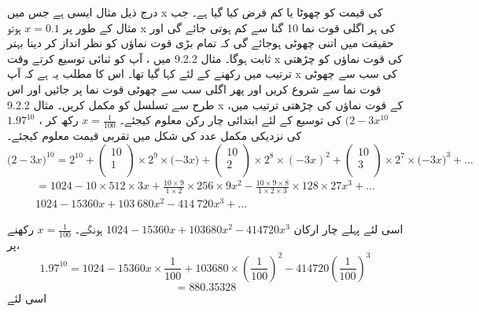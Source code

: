 درج ذیل مثال ایسی ہے جس میں  
x
کی قیمت کو چھوٹا یا کم فرض کیا گیا ہے۔   جب مثال کے طور پر  
\(x=0.1\)
ہوتو   
x
کی ہر اگلی قوت نما  
10
  گنا سے کم ہوتی جائے گی اور حقیقت میں اتنی چھوٹی ہوجائے گی کہ تمام بڑی قوت نماؤں کو نظر  انداز  کر دینا  بہتر  ثابت  ہوگا۔  
مثال 
9.2.2
  میں ،   آپ کو  ثنائی  توسیع  کرتے وقت  
x
کی قوت نماؤں کو  چڑھتی ترتیب میں رکھنے کے لئے کہا گیا تھا۔  اس کا مطلب یہ ہے کہ آپ
x
   کی سب سے چھوٹی قوت نما سے شروع کریں اور پھر اگلی سب سے چھوٹی قوت نما پر جائیں اور اس طرح سے تسلسل کو مکمل کریں۔ 
مثال  
9.2.2
x
کے قوت نماؤں کی چڑھتی ترتیب میں،  
\((2-3{x}^{10}\)
کی توسیع کے لئے ابتدائی چار رکن معلوم کیجئے۔  
 \(x=\frac{1}{100}\)
  رکھ کر  ،  
\(1.97^{10}\)
 کی نزدیکی مکمل عدد کی شکل میں تقربی قیمت  معلوم کیجئے۔ 
 \[(2-3{x)}^{10}= {2}^{10}+
\begin{pmatrix}
10\\
1\\
\end{pmatrix}
\times{2}^{9}\times{(-3{x)}}+
\begin{pmatrix}
10\\
2\\
\end{pmatrix}
\times{2}^{8}\times{(-3{x})^{2}}+ \begin{pmatrix}
10\\
3\\
\end{pmatrix}\times{2}^{7}\times{(-3{x)}}^{3}+... \]
\begin{align*}
=1024-10\times512\times3{x}+{\frac{10\times9}{1\times2}}\times256\times9{x}^{2}-{\frac{10\times9\times8}{1\times2\times3}}\times128\times27{x}^{3}+...\\
 1024-15360x+103\ 680{x}^{2}-414\ 720{x}^{3}+...
 \end{align*}


اسی لئے پہلے چار ارکان
\(1024-15 360{x}+103 680{x}^{2}-414720{x}^{3}\)
ہونگے۔
\(x=\frac{1}{100}\)
رکھنے پر،
\[1.97^{10}=1024-15360{x}\times\frac{1}{100}+103 680\times(\frac{1}{100})^{2}-414720(\frac{1}{100})^{3}\]
\[=880.35328\]
اسی لئے

